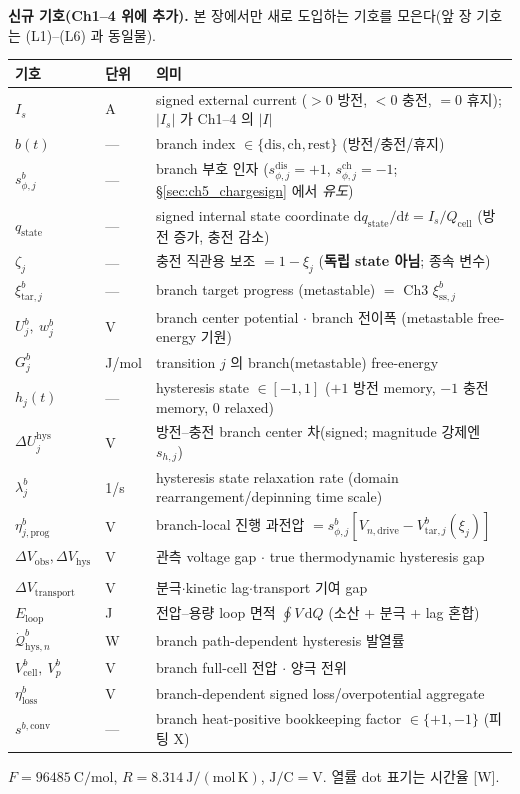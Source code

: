 \documentclass[11pt,a4paper]{article}
\newcommand{\dd}{\mathrm{d}}
\newcommand{\drive}{\mathrm{drive}}
\newcommand{\cell}{\mathrm{cell}}
\newcommand{\prog}{\mathrm{prog}}
\newcommand{\conv}{\mathrm{conv}}
\newcommand{\transp}{\mathrm{transport}}
\newcommand{\dis}{\mathrm{dis}}
\newcommand{\chg}{\mathrm{ch}}
\newcommand{\rst}{\mathrm{rest}}
\newcommand{\hys}{\mathrm{hys}}
\newcommand{\pol}{\mathrm{pol}}
\newcommand{\kin}{\mathrm{kin}}
\newcommand{\obs}{\mathrm{obs}}
\newcommand{\loss}{\mathrm{loss}}
\newcommand{\tar}{\mathrm{tar}}
\newcommand{\stt}{\mathrm{state}}
\newcommand{\sstat}{\mathrm{ss}}
\begin{document}
\textbf{신규 기호(Ch1--4 위에 추가).} 본 장에서만 새로 도입하는 기호를 모은다(앞 장 기호는 (L1)--(L6) 과 동일물).
\begin{longtable}{p{} p{} >{\raggedright\arraybackslash}p{}}
\toprule 기호 & 단위 & 의미 \\ \midrule \endhead
$I_s$ & A & signed external current ($>0$ 방전, $<0$ 충전, $=0$ 휴지); $|I_s|$ 가 Ch1--4 의 $|I|$ \\
$b(t)$ & --- & branch index $\in\{\dis,\chg,\rst\}$ (방전/충전/휴지) \\
$s_{\phi,j}^b$ & --- & branch 부호 인자 ($s_{\phi,j}^\dis=+1$, $s_{\phi,j}^\chg=-1$; \S\ref{sec:ch5_chargesign} 에서 \emph{유도}) \\
$q_\stt$ & --- & signed internal state coordinate $\dd q_\stt/\dd t=I_s/Q_\cell$ (방전 증가, 충전 감소) \\
$\zeta_j$ & --- & 충전 직관용 보조 $=1-\xi_j$ (\textbf{독립 state 아님}; 종속 변수) \\
$\xi_{\tar,j}^b$ & --- & branch target progress (metastable) $=$ Ch3 $\xi_{\sstat,j}^b$ \\
$U_j^b,\ w_j^b$ & V & branch center potential $\cdot$ branch 전이폭 (metastable free-energy 기원) \\
$G_j^b$ & J/mol & transition $j$ 의 branch(metastable) free-energy \\
$h_j(t)$ & --- & hysteresis state $\in[-1,1]$ ($+1$ 방전 memory, $-1$ 충전 memory, $0$ relaxed) \\
$\Delta U_j^\hys$ & V & 방전--충전 branch center 차(signed; magnitude 강제엔 $s_{h,j}$) \\
$\lambda_j^b$ & 1/s & hysteresis state relaxation rate (domain rearrangement/depinning time scale) \\
$\eta_{j,\prog}^b$ & V & branch-local 진행 과전압 $=s_{\phi,j}^b[V_{n,\drive}-V_{\tar,j}^b(\xi_j)]$ \\
$\Delta V_\obs,\Delta V_\hys$ & V & 관측 voltage gap $\cdot$ true thermodynamic hysteresis gap \\
\begin{tabular}[t]{@{}l@{}}$\Delta V_\pol$, $\Delta V_\kin$\\$\Delta V_\transp$\end{tabular} & V & 분극$\cdot$kinetic lag$\cdot$transport 기여 gap \\
$E_{\mathrm{loop}}$ & J & 전압--용량 loop 면적 $\oint V\,\dd Q$ (소산 + 분극 + lag 혼합) \\
$\dot{\mathcal Q}_{\hys,n}^b$ & W & branch path-dependent hysteresis 발열률 \\
$V_\cell^b,\ V_p^b$ & V & branch full-cell 전압 $\cdot$ 양극 전위 \\
$\eta_\loss^b$ & V & branch-dependent signed loss/overpotential aggregate \\
$s^{b,\conv}$ & --- & branch heat-positive bookkeeping factor $\in\{+1,-1\}$ (피팅 X) \\
\bottomrule
\end{longtable}
$F=96485\ \mathrm{C/mol}$, $R=8.314\ \mathrm{J/(mol\,K)}$, $\mathrm{J/C}=\mathrm V$. 열률 dot 표기는 시간율 [W].
\end{document}
